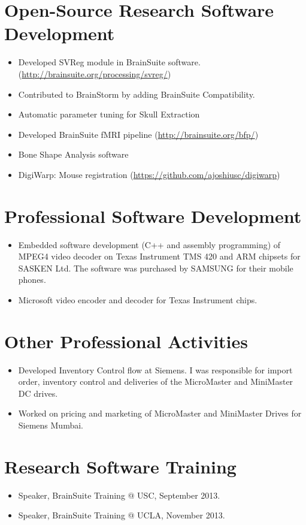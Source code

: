 \documentclass[overlapped,line,letterpaper]{res}
\begin{document}
\begin{resume}
\section{Open-Source Research Software Development}
\begin{itemize}
    \item Developed SVReg module in BrainSuite software. (\url{http://brainsuite.org/processing/svreg/})
    \item Contributed to BrainStorm by adding BrainSuite Compatibility.
    \item Automatic parameter tuning for Skull Extraction 
    \item Developed BrainSuite fMRI pipeline (\url{http://brainsuite.org/bfp/})
    \item Bone Shape Analysis software
    \item DigiWarp: Mouse registration (\url{https://github.com/ajoshiusc/digiwarp})
\end{itemize}

\section{Professional Software Development}
\begin{itemize}
    \item Embedded software development (C++ and assembly programming) of MPEG4 video decoder on Texas Instrument TMS 420 and ARM chipsets for SASKEN Ltd. The software was purchased by SAMSUNG for their mobile phones. 
    \item Microsoft video encoder and decoder for Texas Instrument chips.
    \end{itemize}

\section{Other Professional Activities}
\begin{itemize} 
    \item Developed Inventory Control flow at Siemens. I was responsible for import order, inventory control and deliveries of the MicroMaster and MiniMaster DC drives.
    \item Worked on pricing and marketing of MicroMaster and MiniMaster Drives for Siemens Mumbai.
\end{itemize}

\section{Research Software Training}
\begin{itemize}
\item  Speaker, BrainSuite Training @ USC, September 2013.
\item Speaker, BrainSuite Training @ UCLA, November 2013.
\end{itemize}


\end{resume}
\end{document}
